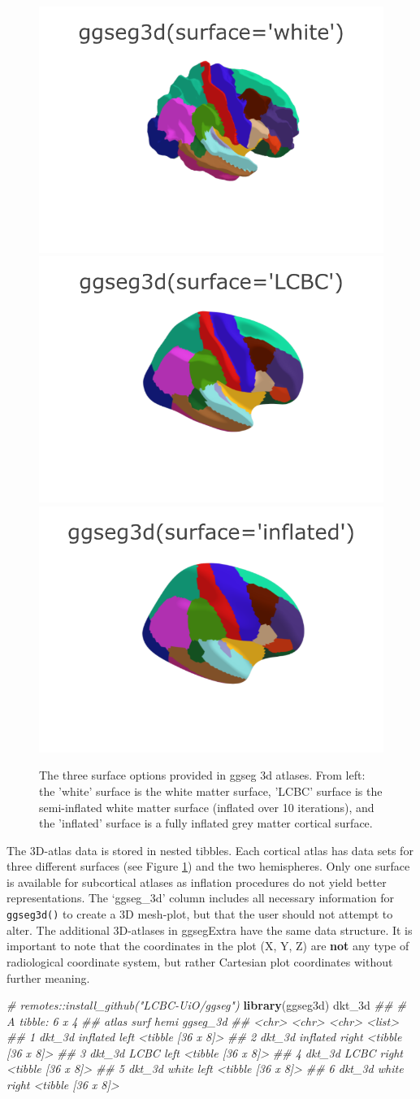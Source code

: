 \documentclass[fleqn,10pt]{wlpeerj} %
\newenvironment{Shaded}{\begin{snugshade}}{\end{snugshade}}
\newcommand{\CommentTok}[1]{\textcolor[rgb]{0.56,0.35,0.01}{\textit{#1}}}
\newcommand{\KeywordTok}[1]{\textcolor[rgb]{0.13,0.29,0.53}{\textbf{#1}}}
\newcommand{\NormalTok}[1]{#1}
\begin{document}
\begin{figure}
\includegraphics[width=0.3\linewidth]{png/ggseg3d_white} \includegraphics[width=0.3\linewidth]{png/ggseg3d} \includegraphics[width=0.3\linewidth]{png/ggseg3d_inflated} \caption{The three surface options provided in ggseg 3d atlases. From left: the 'white' surface is the white matter surface, 'LCBC' surface is the semi-inflated white matter surface (inflated over 10 iterations), and the 'inflated' surface is a fully inflated grey matter cortical surface.}\label{fig:ggseg3d-1-out}
\end{figure}

The 3D-atlas data is stored in nested tibbles.
Each cortical atlas has data sets for three different surfaces (see Figure \ref{fig:ggseg3d-1-out}) and the two hemispheres.
Only one surface is available for subcortical atlases as inflation procedures do not yield better representations.
The `ggseg\_3d' column includes all necessary information for \texttt{ggseg3d()} to create a 3D mesh-plot, but that the user should not attempt to alter.
The additional 3D-atlases in ggsegExtra have the same data structure.
It is important to note that the coordinates in the plot (X, Y, Z) are \textbf{not} any type of radiological coordinate system, but rather Cartesian plot coordinates without further meaning.

\small

\begin{Shaded}
\begin{Highlighting}[]
\CommentTok{# remotes::install_github("LCBC-UiO/ggseg")}
\KeywordTok{library}\NormalTok{(ggseg3d)}
\NormalTok{dkt_3d}
\CommentTok{## # A tibble: 6 x 4}
\CommentTok{##   atlas  surf     hemi  ggseg_3d         }
\CommentTok{##   <chr>  <chr>    <chr> <list>           }
\CommentTok{## 1 dkt_3d inflated left  <tibble [36 x 8]>}
\CommentTok{## 2 dkt_3d inflated right <tibble [36 x 8]>}
\CommentTok{## 3 dkt_3d LCBC     left  <tibble [36 x 8]>}
\CommentTok{## 4 dkt_3d LCBC     right <tibble [36 x 8]>}
\CommentTok{## 5 dkt_3d white    left  <tibble [36 x 8]>}
\CommentTok{## 6 dkt_3d white    right <tibble [36 x 8]>}
\end{Highlighting}
\end{Shaded}
\end{document}
